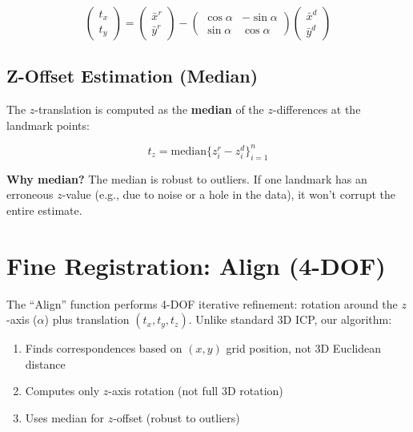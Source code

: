 \documentclass[11pt,a4paper]{article}
\begin{document}
\begin{equation}
\begin{pmatrix} t_x \\ t_y \end{pmatrix} =
\begin{pmatrix} \bar{x}^r \\ \bar{y}^r \end{pmatrix} -
\begin{pmatrix} \cos\alpha & -\sin\alpha \\ \sin\alpha & \cos\alpha \end{pmatrix}
\begin{pmatrix} \bar{x}^d \\ \bar{y}^d \end{pmatrix}
\end{equation}

\subsection{Z-Offset Estimation (Median)}

The $z$-translation is computed as the \textbf{median} of the $z$-differences at the landmark points:

\begin{equation}
t_z = \text{median}\{z_i^r - z_i^d\}_{i=1}^n
\end{equation}

\textbf{Why median?} The median is robust to outliers. If one landmark has an erroneous $z$-value (e.g., due to noise or a hole in the data), it won't corrupt the entire estimate.

\section{Fine Registration: Align (4-DOF)}

The ``Align'' function performs 4-DOF iterative refinement: rotation around the $z$-axis ($\alpha$) plus translation $(t_x, t_y, t_z)$. Unlike standard 3D ICP, our algorithm:

\begin{enumerate}
    \item Finds correspondences based on $(x,y)$ grid position, not 3D Euclidean distance
    \item Computes only $z$-axis rotation (not full 3D rotation)
    \item Uses median for $z$-offset (robust to outliers)
\end{enumerate}
\end{document}
